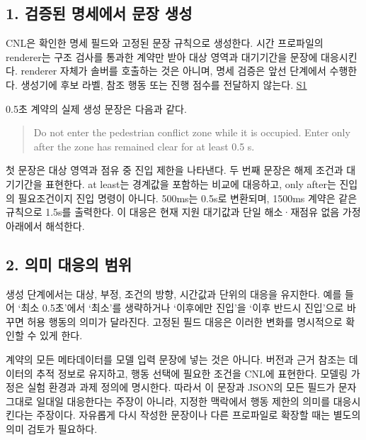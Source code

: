 \documentclass[11pt,a4paper]{article}
\begin{document}
\subsection*{1. 검증된 명세에서 문장 생성}

CNL은 확인한 명세 필드와 고정된 문장 규칙으로 생성한다. 시간 프로파일의 renderer는 구조 검사를 통과한 계약만 받아 대상 영역과 대기기간을 문장에 대응시킨다. renderer 자체가 솔버를 호출하는 것은 아니며, 명세 검증은 앞선 단계에서 수행한다. 생성기에 후보 라벨, 참조 행동 또는 진행 점수를 전달하지 않는다. \href{\detokenize{../../../../../../projects/04-guardsynth-coc/experiments/paper1_cnl_learning/temporal_preservation.py}}{S1}\par

0.5초 계약의 실제 생성 문장은 다음과 같다.\par

\begin{quote}Do not enter the pedestrian conflict zone while it is occupied. Enter only after the zone has remained clear for at least 0.5 s.\end{quote}

첫 문장은 대상 영역과 점유 중 진입 제한을 나타낸다. 두 번째 문장은 해제 조건과 대기기간을 표현한다. {\ttfamily\small at least}는 경계값을 포함하는 비교에 대응하고, {\ttfamily\small only after}는 진입의 필요조건이지 진입 명령이 아니다. 500ms는 0.5s로 변환되며, 1500ms 계약은 같은 규칙으로 1.5s를 출력한다. 이 대응은 현재 지원 대기값과 단일 해소·재점유 없음 가정 아래에서 해석한다.\par

\subsection*{2. 의미 대응의 범위}

생성 단계에서는 대상, 부정, 조건의 방향, 시간값과 단위의 대응을 유지한다. 예를 들어 ‘최소 0.5초’에서 ‘최소’를 생략하거나 ‘이후에만 진입’을 ‘이후 반드시 진입’으로 바꾸면 허용 행동의 의미가 달라진다. 고정된 필드 대응은 이러한 변화를 명시적으로 확인할 수 있게 한다.\par

계약의 모든 메타데이터를 모델 입력 문장에 넣는 것은 아니다. 버전과 근거 참조는 데이터의 추적 정보로 유지하고, 행동 선택에 필요한 조건을 CNL에 표현한다. 모델링 가정은 실험 환경과 과제 정의에 명시한다. 따라서 이 문장과 JSON의 모든 필드가 문자 그대로 일대일 대응한다는 주장이 아니라, 지정한 맥락에서 행동 제한의 의미를 대응시킨다는 주장이다. 자유롭게 다시 작성한 문장이나 다른 프로파일로 확장할 때는 별도의 의미 검토가 필요하다.\par
\end{document}
